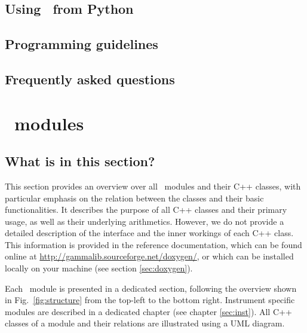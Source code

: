 \documentclass{article}[12pt,a4]
\begin{document}
\subsection{Using \this\ from Python}

\subsection{Programming guidelines}

\subsection{Frequently asked questions}



\clearpage
\section{\this\ modules}

\subsection{What is in this section?}

This section provides an overview over all \this\ modules and their C++ classes, with particular
emphasis on the relation between the classes and their basic functionalities.
It describes the purpose of all C++ classes and their primary usage, as well as their underlying
arithmetics.
However, we do not provide a detailed description of the interface and the inner workings of 
each C++ class.
This information is provided in the reference documentation, which can be found online
at \url{http://gammalib.sourceforge.net/doxygen/}, or which can be installed locally on your
machine (see section \ref{sec:doxygen}).

Each \this\ module is presented in a dedicated section, following the overview shown in 
Fig.~\ref{fig:structure} from the top-left to the bottom right.
Instrument specific modules are described in a dedicated chapter (see chapter \ref{sec:inst}).
All C++ classes of a module and their relations are illustrated using a UML diagram.
\end{document}
